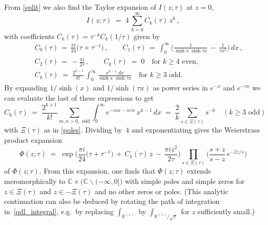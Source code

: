 \documentclass[hyper]{JHEP3}
\newcommand{\C}{{\mathbb{C}}}
\newcommand\be{\begin{equation}}
\newcommand\ee{\end{equation}}
\newcommand\bes{\begin{equation*}}
\newcommand\ees{\end{equation*}}
\newcommand{\beas}{\begin{eqnarray*}}
\newcommand{\eeas}{\end{eqnarray*}}
\def\={\;=\;}
\def\t{\tau}
\def\Rp{\mathbb R^{(+)}}
\def\sm{\smallsetminus}
\begin{document}
\smallskip{} From \eqref{split} we also find the Taylor expansion of  $I(z;\t)$ at $z=0$,
  \bes\label{TaylorI}I(z;\t)\= 4\,\sum_{k=0}^\infty C_k(\t)\,z^k\,, \ees
 with coefficients $C_k(\t)=\t^{-k}C_k(1/\t)$ given by
\beas &&C_0(\t)\,=\,\frac{\pi i}{24}\bigl(\t+\t^{-1}\bigr)\,, \qquad
       C_1(\t)\,=\,\int_0^\infty\biggl(\frac1{\sinh x\;\sinh\t x}\,-\,\frac1{\t x^2}\biggr)\,dx\,, \\
  &&C_2(\t)\,=\,-\frac{\pi i}{2\t}\,,\qquad C_k(\t)\=0\quad\text{for $k\ge4$ even},\\
  &&C_k(\t)\=\frac{2^{k-1}}{k!}\,\int_0^\infty\frac{x^{k-1}\;dx}{\sinh x\;\sinh\t x} \quad\text{for $k\ge3$ odd.} \eeas
By expanding $1/\sinh(x)$ and $1/\sinh(\t x)$ as power series in $e^{-x}$ and $e^{-\t x}$ we can evaluate
the last of these expressions to get
  \bes C_k(\t)\=\frac{2^{k+1}}{k!}\sum_{m,n>0,\text{ odd}}\int_0^\infty e^{-mx-n\t x}\,x^{k-1}\,dx
     \=\frac2k\sum_{s\in\Xi(\t)}s^{-k}\quad(\text{$k\ge3$ odd})\ees
with $\Xi(\t)$ as in \eqref{poles}. Dividing by~4 and exponentiating gives the Weierstrass
product expansion
  \be\label{Weierstrass} \Phi(z;\t)\=\exp\biggl(\frac{\pi i}{24}\bigl(\t+\t^{-1}\bigr)\,+\,C_1(\t)\,z
    \,-\,\frac{\pi iz^2}{2\t}\biggr)\prod_{s\in\Xi(\t)}\biggl(\frac{s+z}{s-z}\,e^{-2z/s}\biggr)\ee
of $\Phi(z;\t)$. From this expansion, one finds that $\Phi(z;\t)$ extends meromorphically to
$\C\times\bigl(\C\sm(-\infty,0]\bigr)$ with simple
poles and simple zeros for $z\in\Xi(\t)$ and $z\in-\Xi(\t)$ and no other zeros or poles. (This analytic continuation can also be deduced
by rotating the path of integration in~\eqref{qdl_integral}, e.g.~by replacing $\int_{\Rp}$ by
$\int_{\Rp/\sqrt\t}$ for $z$ sufficiently small.)
\end{document}
